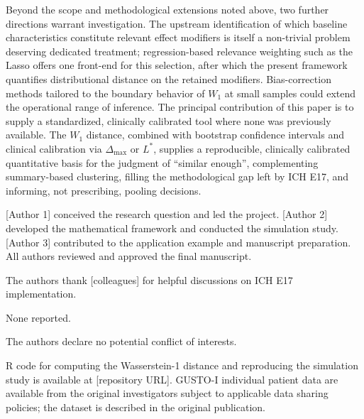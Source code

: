 \documentclass[AMA,Times1COL]{WileyNJDv5}
\begin{document}
Beyond the scope and methodological extensions noted above, two further directions warrant investigation. The upstream identification of which baseline characteristics constitute relevant effect modifiers is itself a non-trivial problem deserving dedicated treatment; regression-based relevance weighting such as the Lasso offers one front-end for this selection,\cite{komiyama2024} after which the present framework quantifies distributional distance on the retained modifiers. Bias-correction methods tailored to the boundary behavior of $W_1$ at small samples could extend the operational range of inference. The principal contribution of this paper is to supply a standardized, clinically calibrated tool where none was previously available. The $W_1$ distance, combined with bootstrap confidence intervals and clinical calibration via $\Delta_{\max}$ or $L^*$, supplies a reproducible, clinically calibrated quantitative basis for the judgment of ``similar enough'', complementing summary-based clustering, filling the methodological gap left by ICH E17, and informing, not prescribing, pooling decisions.



[Author 1] conceived the research question and led the project. [Author 2] developed the mathematical framework and conducted the simulation study. [Author 3] contributed to the application example and manuscript preparation. All authors reviewed and approved the final manuscript.


The authors thank [colleagues] for helpful discussions on ICH E17 implementation.


None reported.


The authors declare no potential conflict of interests.


R code for computing the Wasserstein-1 distance and reproducing the simulation study is available at [repository URL]. GUSTO-I individual patient data are available from the original investigators subject to applicable data sharing policies; the dataset is described in the original publication.\cite{gusto1993}
\end{document}
